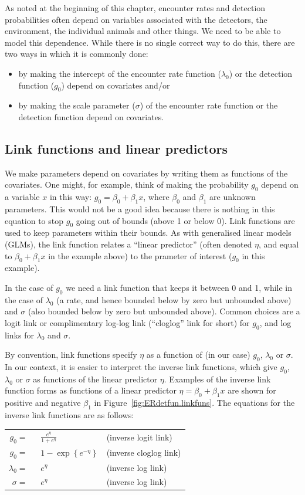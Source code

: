 \documentclass[graybox,envcountchap,sectrefs]{SpringerStyleFiles/styles/svmono}\usepackage[]{graphicx}\usepackage[]{color}
\newcommand{\bi}{\begin{itemize}}
\newcommand{\ei}{\end{itemize}}
\begin{document}
As noted at the beginning of this chapter, encounter rates and detection probabilities often depend on variables associated with the detectors, the environment, the individual animals and other things. We need to be able to model this dependence. While there is no single correct way to do this, there are two ways in which it is commonly done:
\bi
\item by making the intercept of the encounter rate function ($\lambda_0$) or the detection function ($g_0$) depend on covariates and/or
\item by making the scale parameter ($\sigma$) of the encounter rate function or the detection function depend on covariates.
\ei

\subsection{Link functions and linear predictors}

We make parameters depend on covariates by writing them as functions of the covariates. One might, for example, think of making the probability $g_0$ depend on a variable $x$ in this way: $g_0=\beta_0 + \beta_1 x$, where $\beta_0$ and $\beta_1$ are unknown parameters. This would not be a good idea because there is nothing in this equation to stop $g_0$ going out of bounds (above 1 or below 0). Link functions are used to keep parameters within their bounds. As with generalised linear models (GLMs), the link function relates a ``linear predictor'' (often denoted $\eta$, and equal to $\beta_0 + \beta_1 x$ in the example above) to the prameter of interest ($g_0$ in this example).

In the case of $g_0$ we need a link function that keeps it between 0 and 1, while in the case of $\lambda_0$ (a rate, and hence bounded below by zero but unbounded above) and $\sigma$ (also bounded below by zero but unbounded above). Common choices are a logit link or complimentary log-log link (``cloglog'' link for short) for $g_0$, and log links for $\lambda_0$ and $\sigma$. 

By convention, link functions specify $\eta$ as a function of (in our case) $g_0$, $\lambda_0$ or $\sigma$. In our context, it is easier to interpret the inverse link functions, which give $g_0$, $\lambda_0$ or $\sigma$ as functions of the linear predictor $\eta$. Examples of the inverse link function forms as functions of a linear predictor $\eta=\beta_0+\beta_1 x$ are shown for positive and negative $\beta_1$ in Figure~\ref{fig:ERdetfun.linkfuns}. The equations for the inverse link functions are as follows:
\begin{center}
\begin{tabular}{ rll } 
$g_0=\;$ & $\;\frac{e^\eta}{1+e^\eta}$ & (inverse logit link) \\
$g_0=\;$ & $\;1-\exp\left\{e^{-\eta}\right\}$ & (inverse cloglog link) \\
$\lambda_0=\;$ & $\;e^\eta$ & (inverse log link) \\
$\sigma=\;$ & $\;e^\eta$ & (inverse log link)
\end{tabular}
\end{center}
\end{document}
